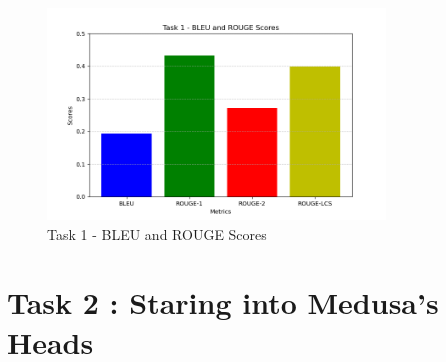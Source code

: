 \documentclass[12pt]{article}
\begin{document}
\begin{figure}[htbp]
    \centering
    \includegraphics[width=0.8\textwidth]{task1.png}
    \caption{Task 1 - BLEU and ROUGE Scores}
    \label{fig:task1_scores}
\end{figure}

\newpage

\section{Task 2 : Staring into Medusa's Heads}



\end{document}
